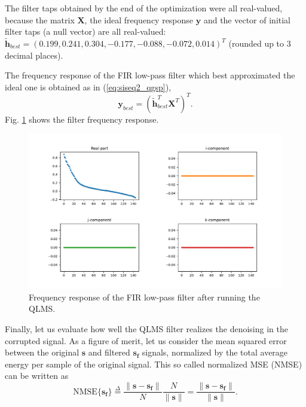 The filter taps obtained by the end of the optimization were all real-valued, because the matrix $\mathbf{X}$, the ideal frequency response $\mathbf{y}$ and the vector of initial filter taps (a null vector) are all real-valued: $\mathbf{\widetilde{h}}_{best} = (
    0.199, 0.241, 0.304, -0.177, -0.088, -0.072, 0.014
    )^T$ (rounded up to 3 decimal places).

The frequency response of the FIR low-pass filter which best approximated the ideal one is obtained as in (\ref{eq:siseq2_qgsp}),
\begin{equation}
    \mathbf{y}_{best} = \left(
    \mathbf{\widetilde{h}}_{best}^T \mathbf{X}^T
    \right)^T.
\end{equation}
Fig. \ref{fig:uk_qlm_filter} shows the filter frequency response.

\begin{figure}
    \centering
    \includegraphics[width=\linewidth]{Figures/uk_example/uk_qlm_filter.pdf}
    \caption{Frequency response of the FIR low-pass filter after running the QLMS.}
    \label{fig:uk_qlm_filter}
\end{figure}

Finally, let us evaluate how well the QLMS filter realizes the denoising in the corrupted signal. As a figure of merit, let us consider the mean squared error between the original $\mathbf{s}$ and filtered $\mathbf{s_f}$ signals, normalized by the total average energy per sample of the original signal. This so called normalized MSE (NMSE) can be written as
\begin{equation}
    \label{eq:errormetric}
    \text{NMSE}\{ \mathbf{s_f} \} \overset{\Delta}{=}
    \frac{\parallel \mathbf{s} - \mathbf{s_f} \parallel}{N}
    \frac{N}{{\parallel \mathbf{s} \parallel}}
    =
    \frac{\parallel \mathbf{s} - \mathbf{s_f} \parallel}{\parallel \mathbf{s} \parallel}.
\end{equation}

